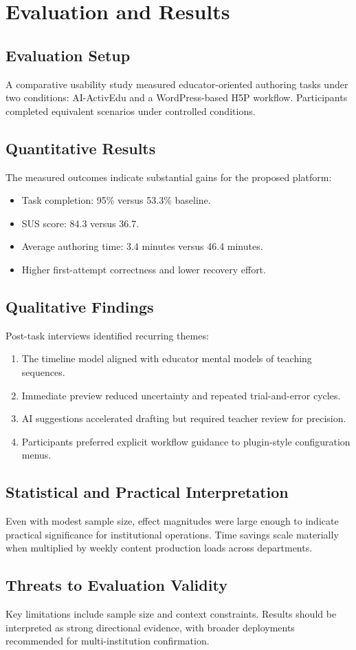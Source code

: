 \chapter{Evaluation and Results}

\section{Evaluation Setup}
A comparative usability study measured educator-oriented authoring tasks under two conditions: AI-ActivEdu and a WordPress-based H5P workflow. Participants completed equivalent scenarios under controlled conditions.

\section{Quantitative Results}
The measured outcomes indicate substantial gains for the proposed platform:
\begin{itemize}[leftmargin=2em]
\item Task completion: 95\% versus 53.3\% baseline.
\item SUS score: 84.3 versus 36.7.
\item Average authoring time: 3.4 minutes versus 46.4 minutes.
\item Higher first-attempt correctness and lower recovery effort.
\end{itemize}



\section{Qualitative Findings}
Post-task interviews identified recurring themes:
\begin{enumerate}[leftmargin=2em]
\item The timeline model aligned with educator mental models of teaching sequences.
\item Immediate preview reduced uncertainty and repeated trial-and-error cycles.
\item AI suggestions accelerated drafting but required teacher review for precision.
\item Participants preferred explicit workflow guidance to plugin-style configuration menus.
\end{enumerate}

\section{Statistical and Practical Interpretation}
Even with modest sample size, effect magnitudes were large enough to indicate practical significance for institutional operations. Time savings scale materially when multiplied by weekly content production loads across departments.

\section{Threats to Evaluation Validity}
Key limitations include sample size and context constraints. Results should be interpreted as strong directional evidence, with broader deployments recommended for multi-institution confirmation.
